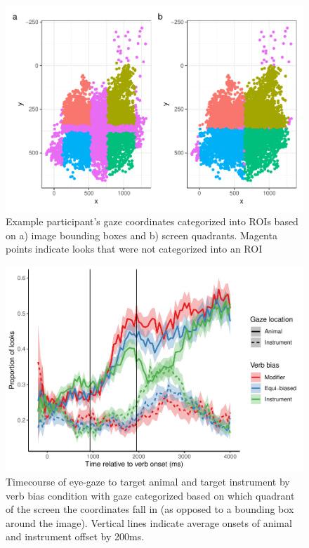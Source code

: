 \documentclass[
  man,floatsintext]{apa6}
\begin{document}
\begin{figure}
\centering
\includegraphics{manuscript_files/figure-latex/E4-example-subj-looks-ROI-1.pdf}
\caption{\label{fig:E4-example-subj-looks-ROI}Example participant's gaze coordinates categorized into ROIs based on a) image bounding boxes and b) screen quadrants. Magenta points indicate looks that were not categorized into an ROI}
\end{figure}

\begin{figure}
\centering
\includegraphics{manuscript_files/figure-latex/E4-gaze-timecourse-fig-quadrants-1.pdf}
\caption{\label{fig:E4-gaze-timecourse-fig-quadrants}Timecourse of eye-gaze to target animal and target instrument by verb bias condition with gaze categorized based on which quadrant of the screen the coordinates fall in (as opposed to a bounding box around the image). Vertical lines indicate average onsets of animal and instrument offset by 200ms.}
\end{figure}
\end{document}
